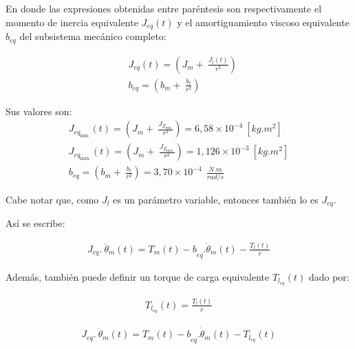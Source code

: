 \documentclass{article}
\begin{document}
\begin{sloppypar}
En donde las expresiones obtenidas entre paréntesis son respectivamente el momento de inercia equivalente $J_{eq}(t)$ y el amortiguamiento viscoso equivalente $b_{eq}$ del subsistema mecánico completo:

\begin{subequations} \label{eq:J_eq y b_eq}
    \begin{align}
        & \label{eq:J_eq}   J_{eq}(t)=\left(J_m+\ \frac{J_l(t)}{r^2}\right)
        \\
        & \label{eq:b_eq}   b_{eq}=\left(b_m+\ \frac{b_l}{r^2}\right)
    \end{align}
\end{subequations}

Sus valores son:
\begin{subequations} \label{eq:Valores de J_eq y b_eq}
	\begin{align}
        J_{eq_{\text{mín.}}}(t)=(J_m+\ \frac{J_{Z_{\text{mín.}}}}{r^2})= 6,58\times10^{-4} ~[kg.m^2]
        \\
        J_{eq_{\text{máx.}}}(t)=(J_m+\ \frac{J_{Z_{\text{máx.}}}}{r^2})= 1,126\times10^{-3} ~[kg.m^2]
        \\
        b_{eq}=(b_m+\ \frac{b_l}{r^2})=3,70\times10^{-4}\ \ \frac{N.m}{rad/s}
    \end{align}
\end{subequations}


Cabe notar que, como $J_l$ es un parámetro variable, entonces también lo es $J_{eq}$.

Así se escribe:

\begin{align} \label{eq:J}
    J_{eq}.\ \ddot{\theta}_m\left(t\right)={T_m\left(t\right)-b}_{eq}.\dot{\theta}_m(t)-\frac{T_l(t)}{r}
\end{align}

Además, también puede definir un torque de carga equivalente $T_{l_{eq}}(t)$ dado por:

\begin{align} \label{eq:T_l_eq}
    T_{l_{eq}}(t)=\frac{T_l(t)}{r}
\end{align}

\begin{align} \label{eq:J con T_l_eq}
    J_{eq}.\ \ddot{\theta}_m\left(t\right)={T_m\left(t\right)-b}_{eq}.\dot{\theta}_m(t)-T_{l_{eq}}(t)
\end{align}



\end{sloppypar}
\end{document}
